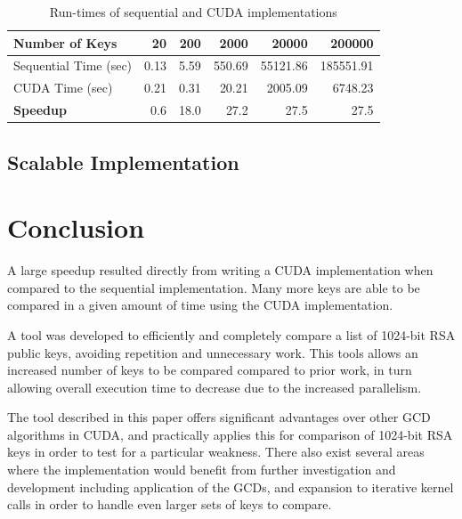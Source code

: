 \documentclass[smallextended]{svjour3}       %
\begin{document}
\begin{table}
   \centering
   \begin{tabular}{|l|*{5}{r}|}\hline
      Number of Keys        & 20   & 200  & 2000   & 20000    & 200000 \\ \hline
      Sequential Time (sec) & 0.13 & 5.59 & 550.69 & 55121.86 & 185551.91\\
      CUDA Time (sec)       & 0.21 & 0.31 & 20.21  & 2005.09  & 6748.23\\\hline
      \textbf{Speedup}      & 0.6  & 18.0 & 27.2   & 27.5     & 27.5\\\hline
   \end{tabular}
   \caption{Run-times of sequential and CUDA implementations}
   \label{tab:runtimes}
\end{table}

\subsection{Scalable Implementation}
\label{scaleimpl}


\section{Conclusion}
\label{sec:concl}
A large speedup resulted directly from writing a CUDA 
implementation when compared to the sequential implementation. Many 
more keys are able to be compared in a given amount of time using the CUDA
implementation. 

A tool was developed to efficiently and completely compare a list of 1024-bit 
RSA public keys, avoiding repetition and unnecessary work. This 
tools allows an increased number of keys to be compared 
compared to prior work, in turn allowing overall execution time to decrease due 
to the increased parallelism.

The tool described in this paper offers significant advantages over other GCD 
algorithms in CUDA, and practically applies this for comparison of 1024-bit 
RSA keys in order to test for a particular weakness. There also exist 
several areas where the implementation would benefit from further 
investigation and development including application of the GCDs, and 
expansion to iterative kernel calls in order to handle even larger sets of 
keys to compare.

\end{document}
